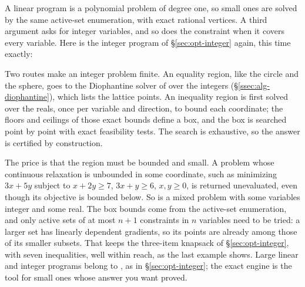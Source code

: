 A linear program is a polynomial problem of degree one, so small ones are solved
by the same active-set enumeration, with exact rational vertices. A third
argument  asks for integer variables, and so does the constraint
 when it covers every variable. Here is the
integer program of \S\ref{sec:opt-integer} again, this time exactly:

\begin{codepairs}
\end{codepairs}

Two routes make an integer problem finite. An equality region, like the circle
and the sphere, goes to the Diophantine solver of  over the integers
(\S\ref{ssec:alg-diophantine}), which lists the lattice points. An inequality
region is first solved over the reals, once per variable and direction, to bound
each coordinate; the floors and ceilings of those exact bounds define a box, and
the box is searched point by point with exact feasibility tests. The search is
exhaustive, so the answer is certified by construction.

The price is that the region must be bounded and small. A problem whose
continuous relaxation is unbounded in some coordinate, such as minimizing
\(3x + 5y\) subject to \(x + 2y \ge 7\), \(3x + y \ge 6\), \(x, y \ge 0\), is
returned unevaluated, even though its objective is bounded below. So is a mixed
problem with some variables integer and some real. The box bounds come from the
active-set enumeration, and only active sets of at most \(n + 1\) constraints
in \(n\) variables need to be tried: a larger set has linearly dependent
gradients, so its points are already among those of its smaller subsets. That
keeps the three-item knapsack of \S\ref{sec:opt-integer}, with seven
inequalities, well within reach, as the last example shows. Large linear and integer programs
belong to , as in \S\ref{sec:opt-integer}; the exact engine is the
tool for small ones whose answer you want proved.


